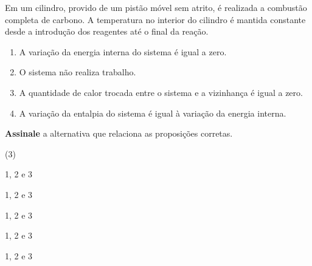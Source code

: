 \documentclass[braun, twocolumn]{braun}
\begin{document}
\begin{problem}
[2A26]Em um cilindro, provido de um pistão móvel sem atrito, é realizada a
combustão completa de carbono. A temperatura no interior do cilindro é
mantida constante desde a introdução dos reagentes até o final da
reação.

\begin{enumerate}
\def\labelenumi{\arabic{enumi}.}

\item
  A variação da energia interna do sistema é igual a zero.
\item
  O sistema não realiza trabalho.
\item
  A quantidade de calor trocada entre o sistema e a vizinhança é igual a
  zero.
\item
  A variação da entalpia do sistema é igual à variação da energia
  interna.
\end{enumerate}

\textbf{Assinale} a alternativa que relaciona as proposições corretas.


\begin{choices}
(3)
\item 1, 2 e 3

\item 1, 2 e 3

\item 1, 2 e 3

\item 1, 2 e 3

\item 1, 2 e 3

\end{choices}

\end{problem}
\end{document}
